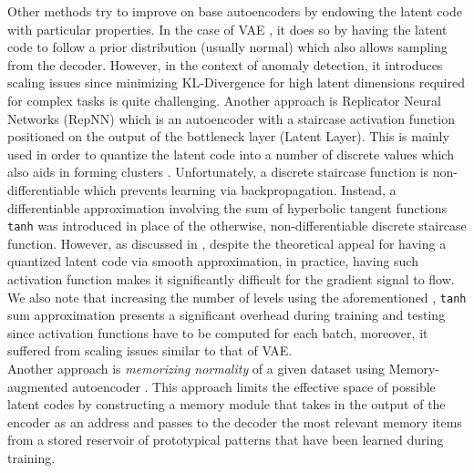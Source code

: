 \documentclass[acmtog, nonacm]{acmart}
\begin{document}
Other methods try to improve on base autoencoders by endowing the latent code with particular properties. In the case of VAE \cite{an2015variational}, it does so by having the latent code to follow a prior distribution (usually normal) which also allows sampling from the decoder. However, in the context of anomaly detection, it introduces scaling issues since minimizing KL-Divergence for high latent dimensions required for complex tasks is quite challenging. 
Another approach is Replicator Neural Networks (RepNN) \cite{hawkins2002outlier} which is an autoencoder with a staircase activation function positioned on the output of the bottleneck layer (Latent Layer). This is mainly used in order to quantize the latent code into a number of discrete values which also aids in forming clusters \cite{williams2002comparative}. Unfortunately, a discrete staircase function is non-differentiable which prevents learning via backpropagation. Instead, a differentiable approximation involving the sum of  hyperbolic tangent functions \texttt{tanh} was introduced in place of the otherwise, non-differentiable discrete staircase function. However, as discussed in \cite{toth2004replicator}, despite the theoretical appeal for having a quantized latent code via smooth approximation, in practice, having such activation function makes it significantly difficult for the gradient signal to flow. We also note that increasing the number of levels using the aforementioned , \texttt{tanh} sum approximation presents a significant overhead during training and testing since  activation functions have to be computed for each batch, moreover, it suffered from scaling issues similar to that of VAE.\\
Another approach is \textit{memorizing normality} of a given dataset using Memory-augmented autoencoder \cite{gong2019memorizing}. This approach limits the effective space of possible latent codes by constructing a memory module that takes in the output of the encoder as an address and passes to the decoder the most relevant memory items from a stored reservoir of prototypical patterns that have been learned during training.\\
\end{document}
